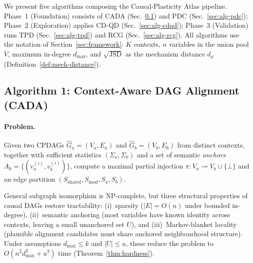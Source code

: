 \documentclass[11pt,a4paper]{article}
\theoremstyle{definition}
\begin{document}
We present five algorithms composing the Causal-Plasticity Atlas pipeline.
Phase~1 (Foundation) consists of \textsc{CADA} (Sec.~\ref{sec:alg-cada}) and
\textsc{PDC} (Sec.~\ref{sec:alg-pdc}); Phase~2 (Exploration) applies
\textsc{CD-QD} (Sec.~\ref{sec:alg-cdqd}); Phase~3 (Validation) runs
\textsc{TPD} (Sec.~\ref{sec:alg-tpd}) and \textsc{RCG}
(Sec.~\ref{sec:alg-rcg}).  All algorithms use the notation of
Section~\ref{sec:framework}: $K$ contexts, $n$ variables in the union pool
$\bar{V}$, maximum in-degree $d_{\max}$, and $\sqrt{\mathrm{JSD}}$ as the
mechanism distance $d_\mu$ (Definition~\ref{def:mech-distance}).

\subsection{Algorithm 1: Context-Aware DAG Alignment (CADA)}
\label{sec:alg-cada}

\paragraph{Problem.}
Given two CPDAGs $\hat{G}_a=(V_a,E_a)$ and $\hat{G}_b=(V_b,E_b)$ from
distinct contexts, together with sufficient statistics
$(\Sigma_a,\Sigma_b)$ and a set of semantic \emph{anchors}
$A_0=\{(v_a^{(i)},v_b^{(i)})\}$, compute a maximal partial injection
$\pi:V_a\rightharpoonup V_b\cup\{\bot\}$ and an edge partition
$(S_{\mathrm{shared}},S_{\mathrm{mod}},S_{a},S_{b})$.

General subgraph isomorphism is NP-complete, but three structural
properties of causal DAGs restore tractability: (i)~sparsity
($|E|=O(n)$ under bounded in-degree), (ii)~semantic anchoring (most
variables have known identity across contexts, leaving a small
unanchored set $U$), and (iii)~Markov-blanket locality (plausible
alignment candidates must share anchored neighbourhood structure).
Under assumptions $d_{\max}\le k$ and $|U|\le u$, these reduce the
problem to $O(n^2 d_{\max}^2+u^3)$ time (Theorem~\ref{thm:hardness}).
\end{document}

